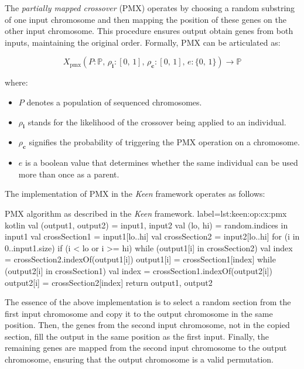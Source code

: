 \begin{definition}
    The \textit{partially mapped crossover} (PMX) operates by choosing a random substring of one input chromosome and 
    then mapping the position of these genes on the other input chromosome. This procedure ensures output obtain genes 
    from both inputs, maintaining the original order. Formally, PMX can be articulated as:

    \begin{equation}
        X_\mathrm{pmx}(P: \mathbb{P},\, \rho_\mathbf{i}: [0,\, 1],\, \rho_\mathbf{c}: [0,\, 1],\, e: \{0,\, 1\}) 
            \to \mathbb{P}
    \end{equation}

    where:

    \begin{itemize}
        \item \(P\) denotes a population of sequenced chromosomes.
        \item \(\rho_\mathbf{i}\) stands for the likelihood of the crossover being applied to an individual.
        \item \(\rho_\mathbf{c}\) signifies the probability of triggering the PMX operation on a chromosome.
        \item \(e\) is a boolean value that determines whether the same individual can be used more than once as a parent.
    \end{itemize}
\end{definition}

The implementation of PMX in the \textit{Keen} framework operates as follows:

\begin{code}{
    PMX algorithm as described in the \textit{Keen} framework.
}{
    label={lst:keen:op:cx:pmx}
}{kotlin}
    val (output1, output2) = input1, input2
    val (lo, hi) = random.indices in input1
    val crossSection1 = input1[lo..hi]
    val crossSection2 = input2[lo..hi]
    for (i in 0..input1.size) {
        if (i < lo or i >= hi) {
            while (output1[i] in crossSection2) {
                val index = crossSection2.indexOf(output1[i])
                output1[i] = crossSection1[index]
            }
            while (output2[i] in crossSection1) {
                val index = crossSection1.indexOf(output2[i])
                output2[i] = crossSection2[index]
            }
        }
    }
    return output1, output2
\end{code}

The essence of the above implementation is to select a random section from the first input chromosome and copy it to 
the output chromosome in the same position. Then, the genes from the second input chromosome, not in the copied 
section, fill the output in the same position as the first input. Finally, the remaining genes are mapped from the 
second input chromosome to the output chromosome, ensuring that the output chromosome is a valid permutation. 

